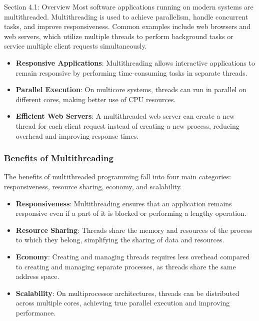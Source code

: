 \begin{notes}{Section 4.1: Overview}
    Most software applications running on modern systems are multithreaded. Multithreading is used to achieve parallelism, handle concurrent tasks, and improve responsiveness. Common examples include 
    web browsers and web servers, which utilize multiple threads to perform background tasks or service multiple client requests simultaneously.
    
    \begin{highlight}
    
        \begin{itemize}
            \item \textbf{Responsive Applications}: Multithreading allows interactive applications to remain responsive by performing time-consuming tasks in separate threads.
            \item \textbf{Parallel Execution}: On multicore systems, threads can run in parallel on different cores, making better use of CPU resources.
            \item \textbf{Efficient Web Servers}: A multithreaded web server can create a new thread for each client request instead of creating a new process, reducing overhead and improving response times.
        \end{itemize}
    
    \end{highlight}
    
    \subsubsection*{Benefits of Multithreading}
    
    The benefits of multithreaded programming fall into four main categories: responsiveness, resource sharing, economy, and scalability.
    
    \begin{highlight}
    
        \begin{itemize}
            \item \textbf{Responsiveness}: Multithreading ensures that an application remains responsive even if a part of it is blocked or performing a lengthy operation.
            \item \textbf{Resource Sharing}: Threads share the memory and resources of the process to which they belong, simplifying the sharing of data and resources.
            \item \textbf{Economy}: Creating and managing threads requires less overhead compared to creating and managing separate processes, as threads share the same address space.
            \item \textbf{Scalability}: On multiprocessor architectures, threads can be distributed across multiple cores, achieving true parallel execution and improving performance.
        \end{itemize}
    

\end{highlight}
\end{notes}
